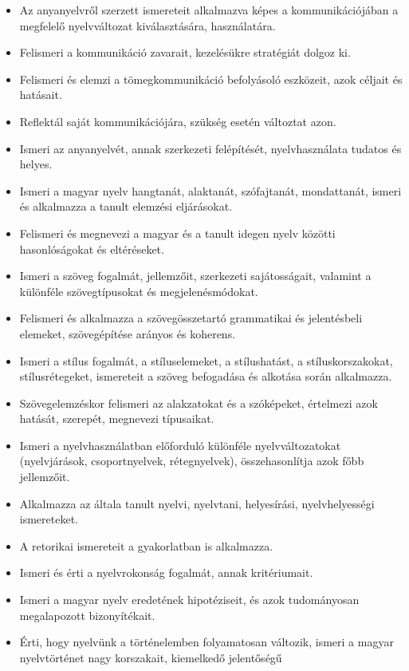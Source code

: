 \begin{itemize}
\item
  Az anyanyelvről szerzett ismereteit alkalmazva képes a
  kommunikációjában a megfelelő nyelvváltozat kiválasztására,
  használatára.
\item
  Felismeri a kommunikáció zavarait, kezelésükre stratégiát dolgoz ki.
\item
  Felismeri és elemzi a tömegkommunikáció befolyásoló eszközeit, azok
  céljait és hatásait.
\item
  Reflektál saját kommunikációjára, szükség esetén változtat azon.
\item
  Ismeri az anyanyelvét, annak szerkezeti felépítését, nyelvhasználata
  tudatos és helyes.
\item
  Ismeri a magyar nyelv hangtanát, alaktanát, szófajtanát, mondattanát,
  ismeri és alkalmazza a tanult elemzési eljárásokat.
\item
  Felismeri és megnevezi a magyar és a tanult idegen nyelv közötti
  hasonlóságokat és eltéréseket.
\item
  Ismeri a szöveg fogalmát, jellemzőit, szerkezeti sajátosságait,
  valamint a különféle szövegtípusokat és megjelenésmódokat.
\item
  Felismeri és alkalmazza a szövegösszetartó grammatikai és jelentésbeli
  elemeket, szövegépítése arányos és koherens.
\item
  Ismeri a stílus fogalmát, a stíluselemeket, a stílushatást, a
  stíluskorszakokat, stílusrétegeket, ismereteit a szöveg befogadása és
  alkotása során alkalmazza.
\item
  Szövegelemzéskor felismeri az alakzatokat és a szóképeket, értelmezi
  azok hatását, szerepét, megnevezi típusaikat.
\item
  Ismeri a nyelvhasználatban előforduló különféle nyelvváltozatokat
  (nyelvjárások, csoportnyelvek, rétegnyelvek), összehasonlítja azok
  főbb jellemzőit.
\item
  Alkalmazza az általa tanult nyelvi, nyelvtani, helyesírási,
  nyelvhelyességi ismereteket.
\item
  A retorikai ismereteit a gyakorlatban is alkalmazza.
\item
  Ismeri és érti a nyelvrokonság fogalmát, annak kritériumait.
\item
  Ismeri a magyar nyelv eredetének hipotéziseit, és azok tudományosan
  megalapozott bizonyítékait.
\item
  Érti, hogy nyelvünk a történelemben folyamatosan változik, ismeri a
  magyar nyelvtörténet nagy korszakait, kiemelkedő jelentőségű

\end{itemize}
